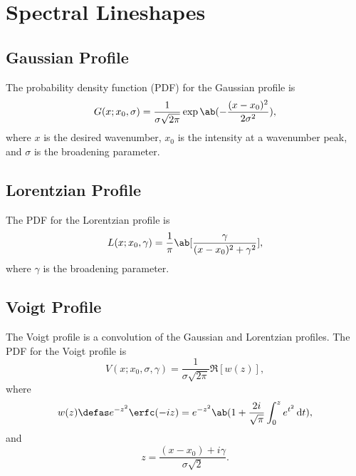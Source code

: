 \chapter{Spectral Lineshapes}
\label{c:spectral_lineshapes}

\section{Gaussian Profile}
\label{s:gaussian_profile}

The probability density function (PDF) for the Gaussian profile is
\begin{equation*}
    G(x; x_0, \sigma) = \frac{1}{\sigma\sqrt{2\pi}}\exp\ab(-\frac{(x - x_0)^2}{2\sigma^2}),
\end{equation*}
where $x$ is the desired wavenumber, $x_0$ is the intensity at a wavenumber peak, and $\sigma$ is the broadening parameter.

\section{Lorentzian Profile}
\label{s:lorentzian_profile}

The PDF for the Lorentzian profile is
\begin{equation*}
    L(x; x_0, \gamma) = \frac{1}{\pi}\ab[\frac{\gamma}{(x - x_0)^2 + \gamma^2}],
\end{equation*}
where $\gamma$ is the broadening parameter.

\section{Voigt Profile}
\label{s:voigt_profile}

The Voigt profile is a convolution of the Gaussian and Lorentzian profiles. The PDF for the Voigt profile is
\begin{equation*}
    V(x; x_0, \sigma, \gamma) = \frac{1}{\sigma\sqrt{2\pi}}\Re[w(z)],
\end{equation*}
where
\begin{equation*}
    w(z) \defas e^{-z^2}\erfc(-iz) = e^{-z^2}\ab(1 +
    \frac{2i}{\sqrt{\pi}}\int_0^z e^{t^2} \odif{t}),
\end{equation*}
and
\begin{equation*}
    z = \frac{(x - x_0) + i\gamma}{\sigma\sqrt{2}}.
\end{equation*}


